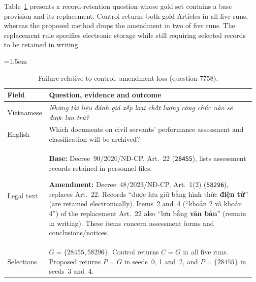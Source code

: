 \begin{table}[H]
\noindent\normalsize Table~\ref{tab:case7758} presents a record-retention question whose gold set contains a base provision and its replacement. Control returns both gold Articles in all five runs, whereas the proposed method drops the amendment in two of five runs. The replacement rule specifies electronic storage while still requiring selected records to be retained in writing.
\par\vspace{5pt}
\centering\small
\emergencystretch=1.5em
\setlength{\tabcolsep}{4pt}
\renewcommand{\arraystretch}{1.08}
\caption{Failure relative to control: amendment loss (question 7758).}
\label{tab:case7758}
\begin{tabularx}{\linewidth}{>{\columncolor{tableband}\raggedright\arraybackslash}p{1.8cm}>{\raggedright\arraybackslash}X}
\hline
\textbf{Field} & \textbf{Question, evidence and outcome}\\\hline
Vietnamese & \emph{Những tài liệu đánh giá xếp loại chất lượng công chức nào sẽ được lưu trữ?}\\\hline
English & Which documents on civil servants' performance assessment and classification will be archived?\\\hline
Legal text & \textbf{Base:} Decree~90/2020/NĐ-CP, Art.~22 (\texttt{28455}), lists assessment records retained in personnel files.
\par\smallskip
\textbf{Amendment:} Decree~48/2023/NĐ-CP, Art.~1(2) (\texttt{58296}), replaces Art.~22. Records ``được lưu giữ bằng hình thức \textbf{điện tử}'' (are retained electronically). Items~2 and~4 (``khoản 2 và khoản 4'') of the replacement Art.~22 also ``lưu bằng \textbf{văn bản}'' (remain in writing). These items concern assessment forms and conclusions/notices.\\\hline
Selections & $G=\{28455,58296\}$. Control returns $C=G$ in all five runs. Proposed returns $P=G$ in seeds~0, 1 and~2, and $P=\{28455\}$ in seeds~3 and~4.\\
\hline
\end{tabularx}
\end{table}
